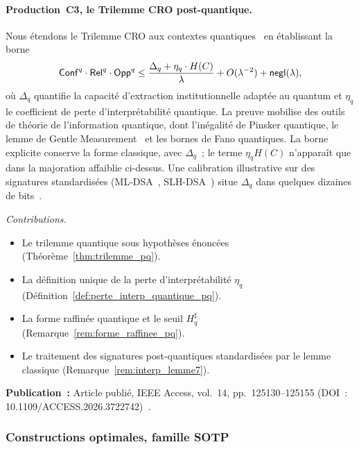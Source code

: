 \begin{sloppypar}
\paragraph{Production~C3, le Trilemme CRO post-quantique.}
Nous \'etendons le Trilemme CRO aux contextes quantiques~\cite{Holevo1973,Wilde2017} en \'etablissant la borne
\begin{equation}
\label{eq:pqcro_bound_intro}
\mathsf{Conf}^q \cdot \mathsf{Rel}^q \cdot \mathsf{Opp}^q \leq
\frac{\Delta_q + \eta_q \cdot H(C)}{\lambda} + O(\lambda^{-2}) + \mathsf{negl}(\lambda),
\end{equation}
o\`u $\Delta_q$ quantifie la capacit\'e d'extraction institutionnelle adapt\'ee
au quantum et $\eta_q$ le coefficient de perte d'interpr\'etabilit\'e quantique.
La preuve mobilise des outils de th\'eorie de l'information quantique, dont
l'in\'egalit\'e de Pinsker quantique, le lemme de Gentle Measurement~\cite{Wilde2017} et les bornes
de Fano quantiques. La borne explicite conserve la forme classique, avec
$\Delta_q$~; le terme $\eta_q H(C)$ n'appara\^it que dans la majoration
affaiblie ci-dessus. Une calibration illustrative sur des signatures
standardis\'ees (ML-DSA~\cite{Dilithium2022}, SLH-DSA~\cite{SPHINCS2022}) situe
$\Delta_q$ dans quelques dizaines de bits~\cite{Mayers1997,Lo1997,Unruh2016,Chatterjee2021}.

\noindent\textit{Contributions.}
\begin{itemize}
  \item[\textbf{C3.1}] Le trilemme quantique sous hypoth\`eses \'enonc\'ees (Th\'eor\`eme~\ref{thm:trilemme_pq}).
  \item[\textbf{C3.2}] La d\'efinition unique de la perte d'interpr\'etabilit\'e $\eta_q$ (D\'efinition~\ref{def:perte_interp_quantique_pq}).
  \item[\textbf{C3.3}] La forme raffin\'ee quantique et le seuil $H^\sharp_q$ (Remarque~\ref{rem:forme_raffinee_pq}).
  \item[\textbf{C3.4}] Le traitement des signatures post-quantiques standardis\'ees par le lemme classique (Remarque~\ref{rem:interp_lemme7}).
\end{itemize}

\textbf{Publication~:} Article publi\'e, IEEE Access, vol.~14, pp.~125130--125155
(DOI~: 10.1109/ACCESS.2026.3722742)~\cite{MINKA2026PQCRO}.

\subsubsection{Constructions optimales, famille SOTP}
\label{subsubsec:obj4_sotp}


\end{sloppypar}

